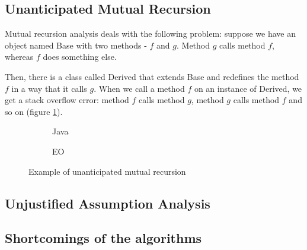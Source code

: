 \subsection{Unanticipated Mutual Recursion}
Mutual recursion analysis deals with the following problem: suppose we have an object named Base with two methods - $f$ and $g$. Method $g$ calls method $f$, whereas $f$ does something else.


Then, there is a class called Derived that extends Base and redefines the method $f$ in a way that it calls $g$. When we call a method $f$ on an instance of Derived, we get a stack overflow error: method $f$ calls method $g$, method $g$ calls method $f$ and so on (figure \ref{fig:mutualrec_basic}).


\begin{figure}
    \centering
    \begin{subfigure}{0.4\textwidth}
        
        \caption{Java}
    \end{subfigure}
    \hfill
    \begin{subfigure}{0.4\textwidth}
        
        \caption{EO}
    \end{subfigure}
    \caption{Example of unanticipated mutual recursion}
    \label{fig:mutualrec_basic}
\end{figure}

\subsection{Unjustified Assumption Analysis}

\subsection{Shortcomings of the algorithms}
